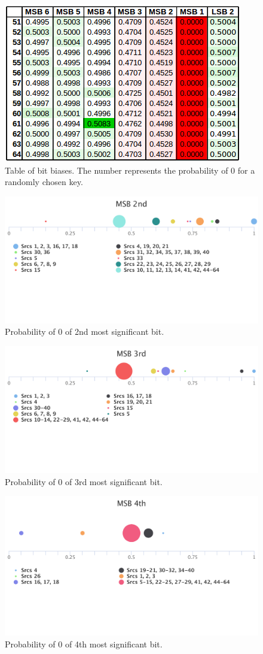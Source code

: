 \begin{figure}[ht]
	\centering
	\includegraphics[width=0.47\linewidth]{tex/images/analysis/bit_sheet_2}
	\caption{Table of bit biases. The number represents the probability of 0 for a randomly chosen key.}
	\label{figure-table-bit-analysis}
\end{figure}

\begin{figure}[ht]
	\includegraphics[width=\linewidth]{tex/images/analysis/bit2}
	\caption{Probability of 0 of 2nd most significant bit.}
\end{figure}

\begin{figure}[ht]
	\includegraphics[width=\linewidth]{tex/images/analysis/bit3}
	\caption{Probability of 0 of 3rd most significant bit.}
\end{figure}

\begin{figure}[ht]
	\includegraphics[width=\linewidth]{tex/images/analysis/bit4}
	\caption{Probability of 0 of 4th most significant bit.}
\end{figure}